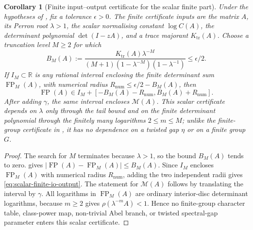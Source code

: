 \documentclass[11pt,a4paper]{amsart}
\theoremstyle{plain}
\newtheorem{corollary}[theorem]{Corollary}
\theoremstyle{definition}
\theoremstyle{remark}
\DeclareMathOperator{\FP}{FP}
\newcommand{\RR}{\mathbb{R}}
\newcommand{\abs}[1]{\lvert #1 \rvert}
\begin{document}
\begin{corollary}[Finite input--output certificate for the scalar finite part]
  \label{cor:scalar-finite-part-finite-io-certificate}
  Under the hypotheses of , fix a tolerance
  \(\epsilon>0\).  The finite certificate inputs are the matrix \(A\), its
  Perron root \(\lambda>1\), the scalar normalising constant \(\log C(A)\),
  the determinant polynomial \(\det(I-zA)\), and a trace majorant
  \(K_{\mathrm{tr}}(A)\).  Choose a truncation level \(M\ge2\) for which
  \begin{equation}\label{eq:scalar-finite-io-tail-choice}
    B_M(A):=
    \frac{K_{\mathrm{tr}}(A)\lambda^{-M}}
      {(M+1)(1-\lambda^{-M})(1-\lambda^{-1})}
    \le \epsilon/2 .
  \end{equation}
  If \(I_M\subset\RR\) is any rational interval enclosing the finite
  determinant sum \(\FP_M(A)\), with numerical radius
  \(R_{\mathrm{num}}\le\epsilon/2-B_M(A)\), then
  \begin{equation}\label{eq:scalar-finite-io-output}
    \FP(A)\in I_M+[-B_M(A)-R_{\mathrm{num}},
                       B_M(A)+R_{\mathrm{num}}].
  \end{equation}
  After adding \(\gamma\), the same interval encloses
  \(\mathcal M(A)\).  This scalar certificate depends on \(\lambda\) only
  through the tail bound and on the finite determinant polynomial through the
  finitely many logarithms \(2\le m\le M\); unlike the finite-group
  certificate in , it has no
  dependence on a twisted gap \(\eta\) or on a finite group \(G\).
\end{corollary}

\begin{proof}
  The search for \(M\) terminates because \(\lambda>1\), so the bound
  \(B_M(A)\) tends to zero.   gives
  \(\abs{\FP(A)-\FP_M(A)}\le B_M(A)\).  Since \(I_M\) encloses
  \(\FP_M(A)\) with numerical radius \(R_{\mathrm{num}}\), adding the two
  independent radii gives \eqref{eq:scalar-finite-io-output}.  The statement
  for \(\mathcal M(A)\) follows by translating the interval by \(\gamma\).
  All logarithms in \(\FP_M(A)\) are ordinary interior-disc determinant
  logarithms, because \(m\ge2\) gives
  \(\rho(\lambda^{-m}A)<1\).  Hence no finite-group character table,
  class-power map, non-trivial Abel branch, or twisted spectral-gap parameter
  enters this scalar certificate.
\end{proof}
\end{document}
